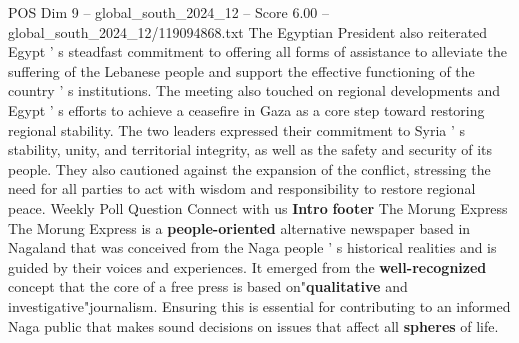 \begin{textsample}{POS Dim 9 – global\_south\_2024\_12 – Score 6.00 – global\_south\_2024\_12/119094868.txt}
The Egyptian President also reiterated Egypt ' s steadfast commitment to offering all forms of assistance to alleviate the suffering of the Lebanese people and support the effective functioning of the country ' s institutions.
The meeting also touched on regional developments and Egypt ' s efforts to achieve a ceasefire in Gaza as a core step toward restoring regional stability.
The two leaders expressed their commitment to Syria ' s stability, unity, and territorial integrity, as well as the safety and security of its people.
They also cautioned against the expansion of the conflict, stressing the need for all parties to act with wisdom and responsibility to restore regional peace.
Weekly Poll Question Connect with us \textbf{Intro} \textbf{footer} The Morung Express The Morung Express is a \textbf{people-oriented} alternative newspaper based in Nagaland that was conceived from the Naga people ' s historical realities and is guided by their voices and experiences.
It emerged from the \textbf{well-recognized} concept that the core of a free press is based on"\textbf{qualitative} and investigative"journalism.
Ensuring this is essential for contributing to an informed Naga public that makes sound decisions on issues that affect all \textbf{spheres} of life.

\end{textsample}
